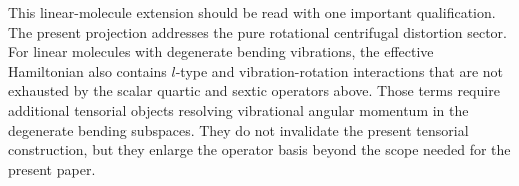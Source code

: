 \documentclass[journal=jacsat,manuscript=article]{achemso}
\begin{document}
This linear-molecule extension should be read with one important qualification.
The present projection addresses the pure rotational centrifugal distortion
sector. For linear molecules with degenerate bending vibrations, the effective
Hamiltonian also contains $l$-type and vibration-rotation interactions that are
not exhausted by the scalar quartic and sextic operators above. Those terms
require additional tensorial objects resolving vibrational angular momentum in
the degenerate bending subspaces. They do not invalidate the present tensorial
construction, but they enlarge the operator basis beyond the scope needed for
the present paper.



\end{document}
